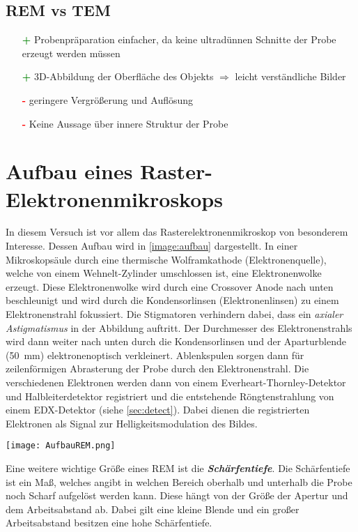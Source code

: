 \subsection*{REM vs TEM}
\begin{itemize}
    \item[\textcolor{green}{\textbf{+}}] Probenpräparation einfacher, da keine ultradünnen Schnitte der Probe erzeugt werden müssen
    \item[\textcolor{green}{\textbf{+}}] 3D-Abbildung der Oberfläche des Objekts $\Rightarrow$ leicht verständliche Bilder 
    \item[\textcolor{red}{\textbf{-}}] geringere Vergrößerung und Auflösung
    \item[\textcolor{red}{\textbf{-}}] Keine Aussage über innere Struktur der Probe \citep{RuppelEM} 
\end{itemize}
\newpage
\section{Aufbau eines Raster-Elektronenmikroskops}
\label{sec:aufbau}
In diesem Versuch ist vor allem das Rasterelektronenmikroskop von besonderem Interesse. Dessen Aufbau wird in \ref{image:aufbau} dargestellt. 
In einer Mikroskopsäule durch eine thermische Wolframkathode (Elektronenquelle), welche von einem Wehnelt-Zylinder umschlossen ist, eine Elektronenwolke erzeugt. Diese Elektronenwolke wird durch eine Crossover Anode nach unten beschleunigt und wird durch die Kondensorlinsen (Elektronenlinsen) zu einem Elektronenstrahl fokussiert. Die Stigmatoren verhindern dabei, dass ein \textit{axialer Astigmatismus} in der Abbildung auftritt. Der Durchmesser des Elektronenstrahls wird dann weiter nach unten durch die Kondensorlinsen und der Aparturblende (\SI{50}{\milli\metre}) elektronenoptisch verkleinert. Ablenkspulen sorgen dann für zeilenförmigen Abrasterung der Probe durch den Elektronenstrahl. Die verschiedenen Elektronen werden dann von einem Everheart-Thornley-Detektor und Halbleiterdetektor registriert und die entstehende Röngtenstrahlung von einem EDX-Detektor (siehe \ref{sec:detect}). Dabei dienen die registrierten Elektronen als Signal zur Helligkeitsmodulation des Bildes.
\begin{center}
    \texttt{[image: AufbauREM.png]}
    \label{image:aufbau}
\end{center}
Eine weitere wichtige Größe eines REM ist die \textit{\textbf{Schärfentiefe}}. Die Schärfentiefe ist ein Maß, welches angibt in welchen Bereich oberhalb und unterhalb die Probe noch Scharf aufgelöst werden kann.  Diese hängt von der Größe der Apertur und dem Arbeitsabstand ab. Dabei gilt eine kleine Blende und ein großer Arbeitsabstand besitzen eine hohe Schärfentiefe. 

